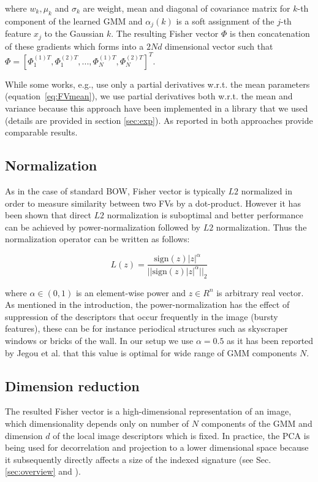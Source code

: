 \documentclass[table]{article} %
\newcommand\abs[1]{\left|#1\right|}
\newcommand\norm[1]{||#1||_2}
\begin{document}
		\noindent
		where $w_k, \mu_k$ and $\sigma_k$ are weight, mean and diagonal of covariance matrix for $k$-th component of the learned GMM and $\alpha_j(k)$ is a soft assignment of the $j$-th feature $x_j$ to the Gaussian $k$. The resulting Fisher vector  $\Phi$ is then concatenation of these gradients which forms into a $2Nd$ dimensional vector such that $\Phi=[\Phi^{(1)T}_1,\Phi^{(2)T}_1,...,\Phi^{(1)T}_N,\Phi^{(2)T}_N]^T$.

		While some works, e.g.\cite{Perronnin2010}, use only a partial derivatives w.r.t. the mean parameters (equation~\eqref{eq:FVmean}), we use partial derivatives both w.r.t. the mean and variance because this approach have been implemented in a library that we used (details are provided in section \ref{sec:exp}). As reported in \cite{Jegou2010} both approaches provide comparable results.

		\subsection{Normalization}
			As in the case of standard BOW, Fisher vector is typically $L2$ normalized in order to measure similarity between two FVs by a dot-product. However it has been shown that direct $L2$ normalization is suboptimal and better performance can be achieved by power-normalization followed by $L2$ normalization. Thus the normalization operator can be written as follows:
			
			\begin{equation}
				L(z)=\dfrac{\text{sign} (z) \abs{z}^\alpha}{\norm{\text{sign}(z) \abs{z}^\alpha}}
				\label{eq:Loperator}
			\end{equation}

			\noindent
			where $\alpha \in (0,1)$ is an element-wise power and $z \in R^n$ is arbitrary real vector. As mentioned in the introduction, the power-normalization has the effect of suppression of the descriptors that occur frequently in the image (bursty features), these can be for instance periodical structures such as skyscraper windows or bricks of the wall. In our setup we use $\alpha=0.5$ as it has been reported by Jegou et al. \cite{Jegou2012HAL} that this value is optimal for wide range of GMM components $N$.

		\subsection{Dimension reduction}
			The resulted Fisher vector is a high-dimensional representation of an image, which dimensionality depends only on number of $N$ components of the GMM and dimension $d$ of the local image descriptors which is fixed. In practice, the PCA is being used for decorrelation and projection to a lower dimensional space because it subsequently directly affects a size of the indexed signature (see Sec. \ref{sec:overview} and \cite{Jegou2011}).
\end{document}
